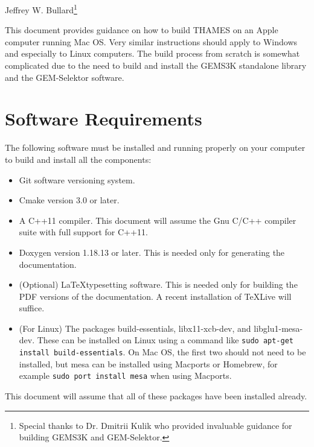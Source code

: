 \documentclass{article}
\begin{document}
\begin{center}
    \Large{\textbf{}}
\end{center}
\begin{center}
    \large{Jeffrey W. Bullard\footnote{Special thanks to Dr. Dmitrii Kulik who
    provided invaluable guidance for building GEMS3K and GEM-Selektor.}}
\end{center}
\begin{center}
    \large{\DTMnow}
\end{center}

\vspace{0.25truein}
\tableofcontents

\vspace{0.25truein}
This document provides guidance on how to build THAMES on an Apple computer running
Mac OS.  Very similar instructions should apply to Windows and especially to Linux
computers.  The build process from scratch is somewhat complicated due to the need
to build and install the GEMS3K standalone library and the GEM-Selektor software.

\section{Software Requirements}
The following software must be installed and running properly on your computer
to build and install all the components:
\begin{itemize}
  \item Git software
  versioning system.
\item Cmake version 3.0 or later.
\item A C++11 compiler.
  This document will assume the Gnu C/C++ compiler suite with full support for
  C++11.
\item Doxygen version 1.18.13 or later. This is needed only for
  generating the documentation.
\item (Optional) \LaTeX typesetting software.
  This is needed only for building the PDF versions of the documentation.  A
  recent installation of \TeX Live will suffice.
\item (For Linux) The packages
  build-essentials, libx11-xcb-dev, and libglu1-mesa-dev. These can be installed
  on Linux using a command like \verb!sudo apt-get install build-essentials!.
  On Mac OS, the first two should not need to be installed, but mesa can be
installed using Macports or Homebrew, for example \verb!sudo port install mesa!
when using Macports.
\end{itemize}
This document will assume that all of these packages have been installed already.
\end{document}
